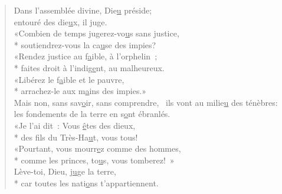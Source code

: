 
\begin{verse}
Dans l’assemblée divine, Die\underline{u} préside; \\
entouré des die\underline{u}x, il juge. \\

«Combien de temps jugerez-vo\underline{u}s sans justice, \\*
soutiendrez-vous la ca\underline{u}se des impies? \\

«Rendez justice au f\underline{a}ible, à l’orphelin ; \\*
faites droit à l’indig\underline{e}nt, au malheureux. \\

«Libérez le f\underline{a}ible et le pauvre, \\*
arrachez-le aux m\underline{a}ins des impies.» \\

Mais non, sans sav\underline{o}ir, sans comprendre,~\psalmdagger
ils vont au milie\underline{u} des ténèbres: \\
les fondements de la terre en s\underline{o}nt ébranlés. \\

«Je l’ai dit : Vous \underline{ê}tes des dieux, \\*
des fils du Très-Ha\underline{u}t, vous tous! \\

«Pourtant, vous mourr\underline{e}z comme des hommes, \\*
comme les princes, to\underline{u}s, vous tomberez! » \\

Lève-toi, Dieu, j\underline{u}ge la terre, \\*
car toutes les nati\underline{o}ns t’appartiennent. \\
\end{verse}


